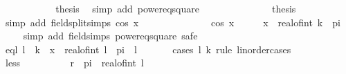 \begin{isabellebody}
\ \ \ \ \ \ \ \ \isamarkupfalse%
\ \isamarkupfalse%
\ {\isacharquery}{\kern0pt}thesis\ \isamarkupfalse%
\ {\isacharparenleft}{\kern0pt}simp\ add{\isacharcolon}{\kern0pt}\ power{}{\isacharunderscore}{\kern0pt}eq{\isacharunderscore}{\kern0pt}square{\isacharparenright}{\kern0pt}\isanewline
\ \ \ \ \ \ \isamarkupfalse%
\isanewline
\ \ \ \ \ \ \isamarkupfalse%
\ {\isacharquery}{\kern0pt}thesis\ \isamarkupfalse%
\ {\isacharparenleft}{\kern0pt}simp\ add{\isacharcolon}{\kern0pt}\ field{\isacharunderscore}{\kern0pt}split{\isacharunderscore}{\kern0pt}simps\ {\isacartoucheopen}cos\ x\ {\isasymnoteq}\ {}{\isacartoucheclose}{\isacharparenright}{\kern0pt}\isanewline
\ \ \ \ \isamarkupfalse%
\isanewline
\ \ \ \ \isamarkupfalse%
\ {\isachardoublequoteopen}{}\ {\isacharslash}{\kern0pt}\ {\isacharparenleft}{\kern0pt}cos\ x{\isacharparenright}{\kern0pt}\ {\isacharminus}{\kern0pt}\ {}\ {\isacharequal}{\kern0pt}\ {}\ {\isasymlongrightarrow}\ x\ {\isasymin}\ {\isacharbraceleft}{\kern0pt}real{\isacharunderscore}{\kern0pt}of{\isacharunderscore}{\kern0pt}int\ k\ {\isacharasterisk}{\kern0pt}\ pi{\isacharbraceright}{\kern0pt}{\isachardoublequoteclose}\isanewline
\ \ \ \ \isamarkupfalse%
{\isacharparenleft}{\kern0pt}simp\ add{\isacharcolon}{\kern0pt}\ field{\isacharunderscore}{\kern0pt}simps\ power{}{\isacharunderscore}{\kern0pt}eq{\isacharunderscore}{\kern0pt}square{\isacharcomma}{\kern0pt}\ safe{\isacharparenright}{\kern0pt}\isanewline
\ \ \ \ \ \ \isamarkupfalse%
\ eql{\isacharcolon}{\kern0pt}\ {\isachardoublequoteopen}l\ {\isacharequal}{\kern0pt}\ k{\isachardoublequoteclose}\ \ {\isachardoublequoteopen}x\ {\isacharequal}{\kern0pt}\ real{\isacharunderscore}{\kern0pt}of{\isacharunderscore}{\kern0pt}int\ l\ {\isacharasterisk}{\kern0pt}\ pi{\isachardoublequoteclose}\ \ l\isanewline
\ \ \ \ \ \ \isamarkupfalse%
{\isacharparenleft}{\kern0pt}cases\ l\ k\ rule{\isacharcolon}{\kern0pt}\ linorder{\isacharunderscore}{\kern0pt}cases{\isacharparenright}{\kern0pt}\isanewline
\ \ \ \ \ \ \ \ \isamarkupfalse%
\ less\isanewline
\ \ \ \ \ \ \ \ \isamarkupfalse%
\ {\isachardoublequoteopen}r\ {\isasymle}\ pi\ {\isacharasterisk}{\kern0pt}\ real{\isacharunderscore}{\kern0pt}of{\isacharunderscore}{\kern0pt}int\ l{\isachardoublequoteclose}\ \isamarkupfalse%

\end{isabellebody}
